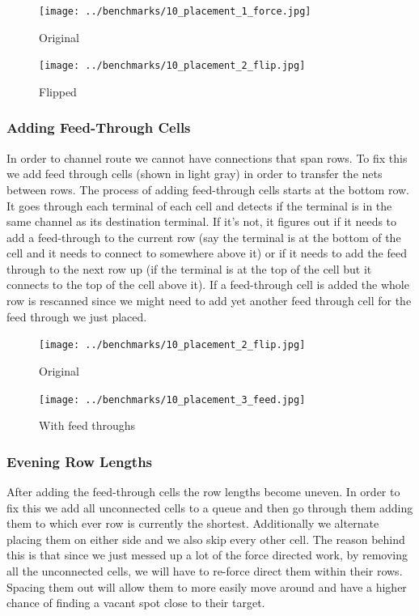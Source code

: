 \documentclass[10pt]{article}
\begin{document}
        \begin{figure}[H]
            \centering
            \texttt{[image: ../benchmarks/10\_placement\_1\_force.jpg]}
            \caption{Original}
        \end{figure}
        \begin{figure}[H]
            \centering
            \texttt{[image: ../benchmarks/10\_placement\_2\_flip.jpg]}
            \caption{Flipped}
        \end{figure}

        \subsubsection{Adding Feed-Through Cells}

        In order to channel route we cannot have connections that span rows. To
        fix this we add feed through cells (shown in light gray) in order to
        transfer the nets between rows. The process of adding feed-through cells
        starts at the bottom row. It goes through each terminal of each cell
        and detects if the terminal is in the same channel as its destination
        terminal. If it's not, it figures out if it needs to add a feed-through
        to the current row (say the terminal is at the bottom of the cell and
        it needs to connect to somewhere above it) or if it needs to add the
        feed through to the next row up (if the terminal is at the top of the
        cell but it connects to the top of the cell above it). If a feed-through
        cell is added the whole row is rescanned since we might need to
        add yet another feed through cell for the feed through we just placed.

        \begin{figure}[H]
            \centering
            \texttt{[image: ../benchmarks/10\_placement\_2\_flip.jpg]}
            \caption{Original}
        \end{figure}
        \begin{figure}[H]
            \centering
            \texttt{[image: ../benchmarks/10\_placement\_3\_feed.jpg]}
            \caption{With feed throughs}
        \end{figure}

        \subsubsection{Evening Row Lengths}

        After adding the feed-through cells the row lengths become uneven. In
        order to fix this we add all unconnected cells to a queue and then go
        through them adding them to which ever row is currently the shortest.
        Additionally we alternate placing them on either side and we also skip
        every other cell. The reason behind this is that since we just messed
        up a lot of the force directed work, by removing all the unconnected
        cells, we will have to re-force direct them within their rows. Spacing
        them out will allow them to more easily move around and have a higher
        chance of finding a vacant spot close to their target.
\end{document}
